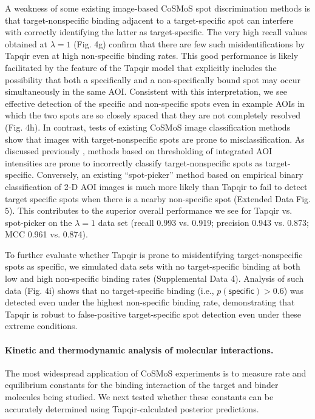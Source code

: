A weakness of some existing image-based CoSMoS spot discrimination methods is that target-nonspecific binding adjacent to a target-specific spot can interfere with correctly identifying the latter as target-specific.  The very high recall values obtained at $\lambda = 1$ (Fig. 4g) confirm that there are few such misidentifications by Tapqir even at high non-specific binding rates.  This good performance is likely facilitated by the feature of the Tapqir model that explicitly includes the possibility that both a specifically and a non-specifically bound spot may occur simultaneously in the same AOI. Consistent with this interpretation, we see effective detection of the specific and non-specific spots even in example AOIs in which the two spots are so closely spaced that they are not completely resolved (Fig. 4h). In contrast, tests of existing CoSMoS image classification methods show that images with target-nonspecific spots are prone to misclassification.  As discussed previously \cite{Friedman2015-nx}, methods based on thresholding of integrated AOI intensities are prone to incorrectly classify target-nonspecific spots as target-specific.  Conversely, an existing ``spot-picker'' method based on empirical binary classification of 2-D AOI images \cite{Friedman2015-nx} is much more likely than Tapqir to fail to detect target specific spots when there is a nearby non-specific spot   (Extended Data Fig. 5).  This contributes to the superior overall performance we see for Tapqir vs. spot-picker on the $\lambda = 1$ data set (recall 0.993 vs. 0.919; precision 0.943 vs. 0.873; MCC 0.961 vs. 0.874).

To further evaluate whether Tapqir is prone to misidentifying target-nonspecific spots as specific, we  simulated data sets with no target-specific binding at both low and high non-specific binding rates (Supplemental Data 4). Analysis of such data (Fig. 4i) shows that no target-specific binding (i.e., $p(\mathsf{specific}) > 0.6$) was detected even under the highest non-specific binding rate, demonstrating that Tapqir is robust to false-positive target-specific spot detection even under these extreme conditions. 

\paragraph{Kinetic and thermodynamic analysis of molecular interactions.}
The most widespread application of CoSMoS experiments is to measure rate and equilibrium constants for the binding interaction of the target and binder molecules being studied.  We next tested whether these constants can be accurately determined using Tapqir-calculated posterior predictions. 

